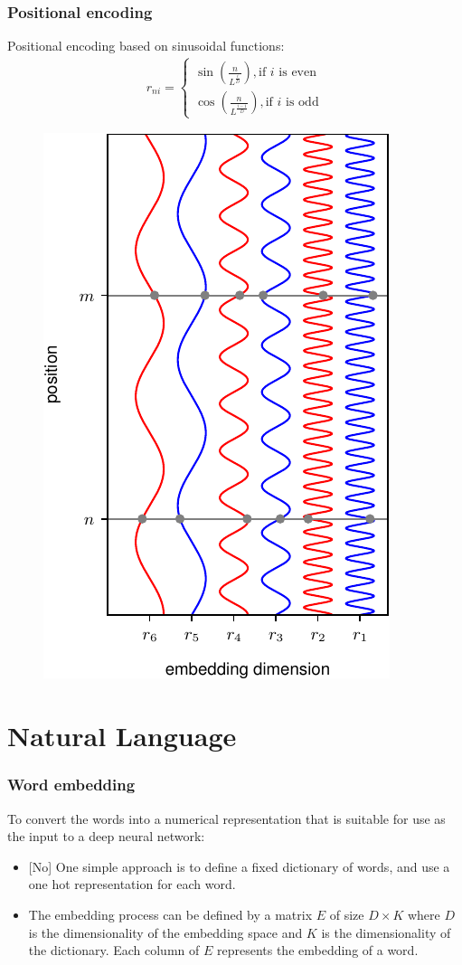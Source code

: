 \documentclass{beamer}
\begin{document}
\begin{frame}
    \frametitle{Positional encoding}
    Positional encoding based on sinusoidal functions:
    \begin{align*}
        r_{ni}=\begin{cases}
            \sin(\frac{n}{L^{\frac{i}{D}}}),\textrm{if $i$ is even} \\
            \cos(\frac{n}{L^{\frac{i-1}{D}}}),\textrm{if $i$ is odd}
        \end{cases}
    \end{align*}
    \begin{figure}
        \includegraphics[height=0.5\textheight]{Figure_10_a.pdf}
    \end{figure}
\end{frame}

\section{Natural Language}

\begin{frame}
    \frametitle{Word embedding}
    To convert the words into a numerical representation that is suitable for use as the input to a deep neural network:
    \begin{itemize}
        \item {[No]} One simple approach is to define a fixed dictionary of words, and use a one hot representation for each word.
        \item The embedding process can be defined by a matrix $E$ of size $D\times{}K$ where $D$ is the dimensionality of the embedding space and $K$ is the dimensionality of the dictionary. Each column of $E$ represents the embedding of a word.
    \end{itemize}
\end{frame}
\end{document}
